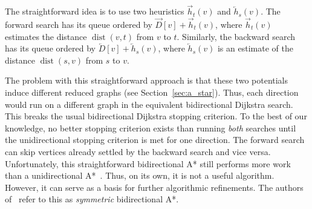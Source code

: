 \documentclass[manuscript]{acmart}
\newcommand*{\dist}{\operatorname{dist}}
\begin{document}
The straightforward idea is to use two heuristics $\overrightarrow{h}_t(v)$ and $\overleftarrow{h}_s(v)$.
The forward search has its queue ordered by $\overrightarrow{D}[v] + \overrightarrow{h}_t(v)$, where $\overrightarrow{h}_t(v)$ estimates the distance $\dist(v,t)$ from $v$ to $t$.
Similarly, the backward search has its queue ordered by $\overleftarrow{D}[v] + \overleftarrow{h}_s(v)$, where $\overleftarrow{h}_s(v)$ is an estimate of the distance $\dist(s,v)$ from $s$ to $v$.

The problem with this straightforward approach is that these two potentials induce different reduced graphs (see Section~\ref{sec:a_star}).
Thus, each direction would run on a different graph in the equivalent bidirectional Dijkstra search.
This breaks the usual bidirectional Dijkstra stopping criterion.
To the best of our knowledge, no better stopping criterion exists than running \emph{both} searches until the unidirectional stopping criterion is met for one direction.
The forward search can skip vertices already settled by the backward search and vice versa.
Unfortunately, this straightforward bidirectional A* still performs more work than a unidirectional A*~\cite{gh-cspas-05}.
Thus, on its own, it is not a useful algorithm.
However, it can serve as a basis for further algorithmic refinements.
The authors of~\cite{gh-cspas-05} refer to this as \emph{symmetric} bidirectional A*.
\end{document}
